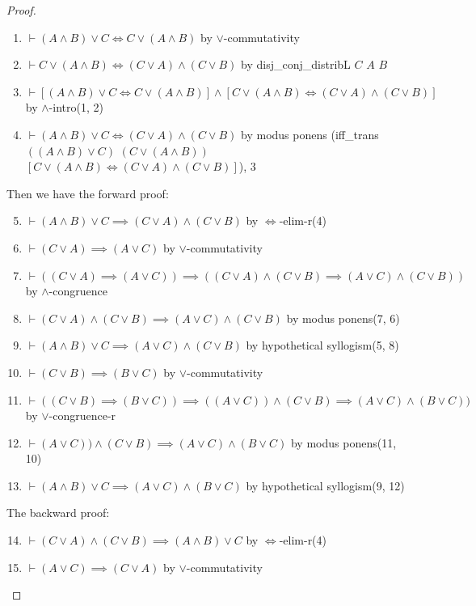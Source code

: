 \begin{proof}
\begin{enumerate}
\item $\vdash (A\land B)\lor C\iff C\lor(A\land B)$ by $\lor$-commutativity
\item $\vdash C\lor(A\land B)\iff (C\lor A)\land(C\lor B)$ by {\Tt{}disj{\_}conj{\_}distribL\nwendquote} $C$ $A$ $B$
\item $\vdash[(A\land B)\lor C\iff C\lor(A\land B)]\land[C\lor(A\land B)\iff (C\lor A)\land(C\lor B)]$ by $\land$-intro(1, 2)%
\item $\vdash(A\land B)\lor C\iff (C\lor A)\land(C\lor B)$ by modus ponens ({\Tt{}iff{\_}trans\nwendquote}
$((A\land B)\lor C)$ $(C\lor(A\land B))$ $[C\lor(A\land B)\iff (C\lor A)\land(C\lor B)]$),
3%
\end{enumerate}
\bigbreak
Then we have the forward proof:
\begin{enumerate}\setcounter{enumi}{4}
\item $\vdash(A\land B)\lor C\implies (C\lor A)\land(C\lor B)$ by $\Leftrightarrow$-elim-r(4)%
\item $\vdash(C\lor A)\implies(A\lor C)$ by $\lor$-commutativity%
\item $\vdash((C\lor A)\implies(A\lor C))\implies((C\lor A)\land(C\lor B)\implies(A\lor C)\land(C\lor B))$
  by $\land$-congruence%
\item $\vdash(C\lor A)\land(C\lor B)\implies(A\lor C)\land(C\lor B)$
  by modus ponens(7, 6)%
\item $\vdash(A\land B)\lor C\implies (A\lor C)\land(C\lor B)$
  by hypothetical syllogism(5, 8)%
\item $\vdash(C\lor B)\implies(B\lor C)$ by $\lor$-commutativity%
\item $\vdash((C\lor B)\implies(B\lor C))\implies((A\lor
  C))\land(C\lor B)\implies(A\lor C)\land(B\lor C))$
  by $\lor$-congruence-r%
\item $\vdash (A\lor C))\land(C\lor B)\implies(A\lor C)\land(B\lor C)$
  by modus ponens(11, 10)%
\item $\vdash(A\land B)\lor C\implies (A\lor C)\land(B\lor C)$
  by hypothetical syllogism(9, 12)%
\end{enumerate}
\bigbreak
The backward proof:
\begin{enumerate}\setcounter{enumi}{13}
\item $\vdash(C\lor A)\land(C\lor B)\implies(A\land B)\lor C$ by $\Leftrightarrow$-elim-r(4)%
\item $\vdash(A\lor C)\implies(C\lor A)$ by $\lor$-commutativity%

\end{enumerate}
\end{proof}
